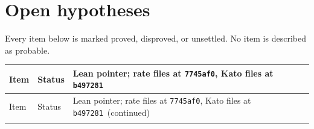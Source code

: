 \documentclass[11pt,a4paper]{article}
\theoremstyle{definition}
\theoremstyle{remark}
\newcommand{\ratecommit}{\texttt{7745af0}}
\newcommand{\katocommit}{\texttt{b497281}}
\begin{document}
\section{Open hypotheses}
\label{sec:open}

Every item below is marked proved, disproved, or unsettled. No item is described as probable.

{\footnotesize
\setlength{\LTpre}{0.6em}
\setlength{\LTpost}{0.6em}
\begin{longtable}{@{}>{\raggedright\arraybackslash}p{3.6cm}>{\raggedright\arraybackslash}p{2.05cm}>{\raggedright\arraybackslash}p{8.6cm}@{}}
\toprule
Item & Status & Lean pointer; rate files at \ratecommit, Kato files at \katocommit \\
\midrule
\endfirsthead
\toprule
Item & Status & Lean pointer; rate files at \ratecommit, Kato files at \katocommit\ (continued) \\
\midrule
\endhead
\bottomrule
\endfoot


\end{longtable}}
\end{document}

